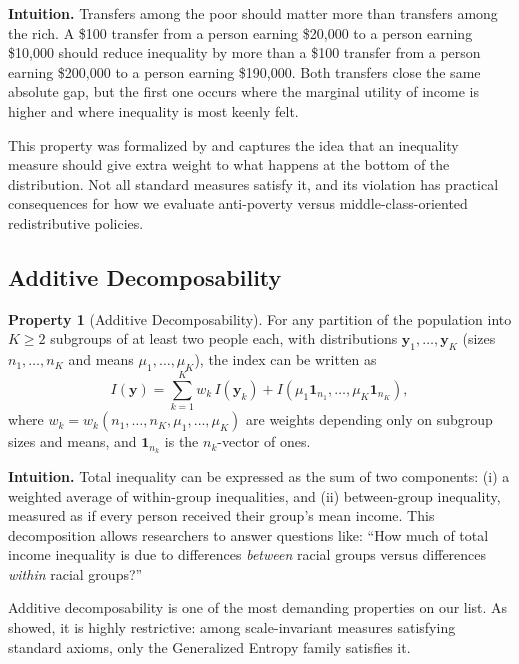 \documentclass[12pt]{article}
\theoremstyle{plain}
\theoremstyle{definition}
\newtheorem{axiom}{Property}
\theoremstyle{remark}
\newcommand{\bfy}{\mathbf{y}}
\newcommand{\bfone}{\mathbf{1}}
\begin{document}
\textbf{Intuition.}
Transfers among the poor should matter more than transfers among the rich.
A \$100 transfer from a person earning \$20{,}000 to a person earning \$10{,}000 should reduce inequality by more than a \$100 transfer from a person earning \$200{,}000 to a person earning \$190{,}000.
Both transfers close the same absolute gap, but the first one occurs where the marginal utility of income is higher and where inequality is most keenly felt.

This property was formalized by \citet{Shorrocks1987} and captures the idea that an inequality measure should give extra weight to what happens at the bottom of the distribution.
Not all standard measures satisfy it, and its violation has practical consequences for how we evaluate anti-poverty versus middle-class-oriented redistributive policies.

\subsection{Additive Decomposability}\label{sec:decomp}

\begin{axiom}[Additive Decomposability]\label{ax:decomp}
For any partition of the population into $K \geq 2$ subgroups of at least two people each, with distributions $\bfy_1, \ldots, \bfy_K$ (sizes $n_1, \ldots, n_K$ and means $\mu_1, \ldots, \mu_K$), the index can be written as
\begin{equation}\label{eq:decomp}
I(\bfy) = \sum_{k=1}^K w_k \, I(\bfy_k) + I(\mu_1 \bfone_{n_1}, \ldots, \mu_K \bfone_{n_K}),
\end{equation}
where $w_k = w_k(n_1, \ldots, n_K, \mu_1, \ldots, \mu_K)$ are weights depending only on subgroup sizes and means, and $\bfone_{n_k}$ is the $n_k$-vector of ones.
\end{axiom}

\textbf{Intuition.}
Total inequality can be expressed as the sum of two components: (i) a weighted average of within-group inequalities, and (ii) between-group inequality, measured as if every person received their group's mean income.
This decomposition allows researchers to answer questions like: ``How much of total income inequality is due to differences \emph{between} racial groups versus differences \emph{within} racial groups?''

Additive decomposability is one of the most demanding properties on our list.
As \citet{Shorrocks1980} showed, it is highly restrictive: among scale-invariant measures satisfying standard axioms, only the Generalized Entropy family satisfies it.
\end{document}

